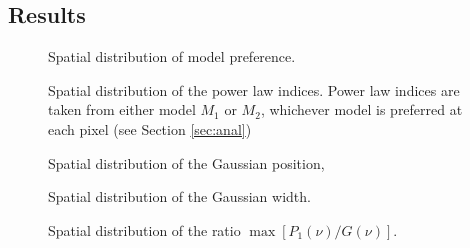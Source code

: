 \documentclass[onecolumn]{emulateapj}
\begin{document}
\subsection{Results}\label{ssec:results}


\begin{figure}
\label{fig:spatialdistribution:preference}
\centerline{
}
\centerline{
}
\centerline{
}
\caption{Spatial distribution of model preference.}
\end{figure}



\begin{figure}
\label{fig:spatialdistribution:powerlawindex}
\centerline{
}
\centerline{
}
\centerline{
}
\caption{Spatial distribution of the power law indices.  Power law
  indices are taken from either model $M_{1}$ or $M_{2}$, whichever
  model is preferred at each pixel (see Section \ref{sec:anal})}
\end{figure}

\begin{figure}
\label{fig:spatialdistribution:gaussianposition}

\caption{Spatial distribution of the Gaussian position,}
\end{figure}


\begin{figure}
\label{fig:spatialdistribution:gaussianwidth}

\caption{Spatial distribution of the Gaussian width.}
\end{figure}


\begin{figure}
\label{fig:spatialdistribution:gaussianamplitude}

\caption{Spatial distribution of the ratio $\max[P_{1}(\nu)/G(\nu)]$.}
\end{figure}
\end{document}
